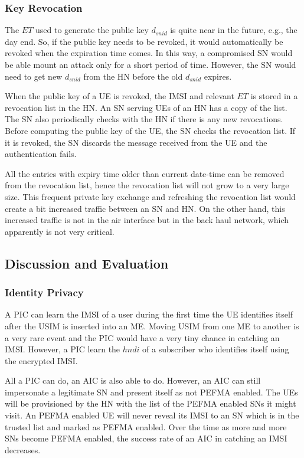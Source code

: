 \documentclass{river-journal}
\begin{document}
\subsubsection{Key Revocation}
The $ET$ used to generate the public key $d_{snid}$ is quite near in the future, e.g., the day end. So, if the public key needs to be revoked, it would automatically be revoked when the expiration time comes. In this way, a compromised SN would be able mount an attack only for a short period of time. However, the SN would need to get new $d_{snid}$ from the HN before the old $d_{snid}$ expires. 

When the public key of a UE is revoked, the IMSI and relevant $ET$ is stored in a revocation list in the HN.  An SN serving UEs of an HN has a copy of the list. The SN also periodically checks with the HN if there is any new revocations. Before computing the public key of the UE, the SN checks the revocation list. If it is revoked, the SN discards the message received from the UE and the authentication fails. 

All the entries with expiry time older than current date-time can be removed from the revocation list, hence the revocation list will not grow to a very large size. This frequent private key exchange and refreshing the revocation list would create a bit increased traffic between an SN and HN. On the other hand, this increased traffic is not in the air interface but in the back haul network, which apparently is not very critical. 

\subsection{Discussion and Evaluation}
\subsubsection{Identity Privacy}
A PIC can learn the IMSI of a user during the first time the UE identifies itself after the USIM is inserted into an ME. Moving USIM from one ME to another is a very rare event and the PIC would have a very tiny chance in catching an IMSI. However, a PIC learn the $hndi$ of a subscriber who identifies itself using the encrypted IMSI.

All a PIC can do, an AIC is also able to do. However, an AIC can still impersonate a legitimate SN and present itself as not PEFMA enabled. The UEs will be provisioned by the HN with the list of the PEFMA enabled SNs it might visit. An PEFMA enabled UE will never reveal its IMSI to an SN which is in the trusted list and marked as PEFMA enabled. Over the time as more and more SNs become PEFMA enabled, the success rate of an AIC in catching an IMSI decreases.
\end{document}
